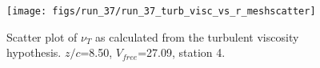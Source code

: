 \begin{figure}[H]
\centering
\texttt{[image: figs/run\_37/run\_37\_turb\_visc\_vs\_r\_meshscatter]}
\caption{Scatter plot of $\nu_T$ as calculated from the turbulent viscosity hypothesis. $z/c$=8.50, $V_{free}$=27.09, station 4.}
\label{fig:run_37_turb_visc_vs_r_meshscatter}
\end{figure}


